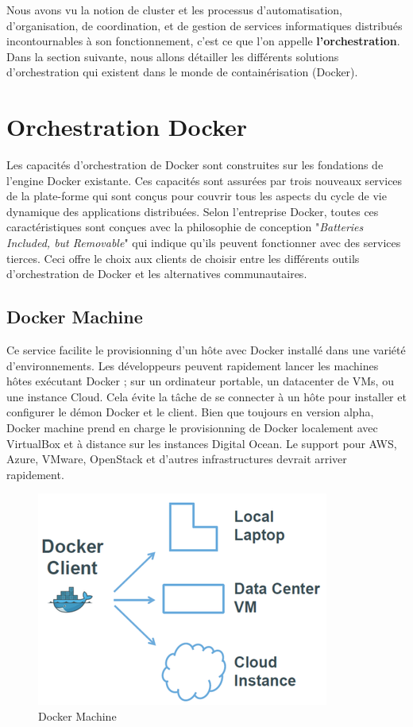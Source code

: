 \begin{onehalfspace}
Nous avons vu la notion de cluster et les processus d'automatisation, d'organisation, de coordination, et de gestion de services informatiques distribués incontournables à son fonctionnement, c'est ce que l'on appelle \textbf{l'orchestration}. Dans la section suivante, nous allons détailler les différents solutions d'orchestration qui existent dans le monde de containérisation (Docker).

\section{Orchestration Docker}
Les capacités d'orchestration de Docker sont construites sur les fondations de l'engine Docker existante. Ces capacités sont assurées par trois nouveaux services de la plate-forme qui sont conçus pour couvrir tous les aspects du cycle de vie dynamique des applications distribuées. Selon l'entreprise Docker, toutes ces caractéristiques sont conçues avec la philosophie de conception "\emph{Batteries Included, but Removable}" qui indique qu'ils peuvent fonctionner avec des services tierces. Ceci offre le choix aux clients de choisir entre les différents outils d'orchestration de Docker et les alternatives communautaires.


\subsection{Docker Machine}
 Ce service facilite le provisionning d'un hôte avec Docker installé dans une variété d'environnements. Les développeurs peuvent rapidement lancer les machines hôtes exécutant Docker ; sur un ordinateur portable, un datacenter de VMs, ou une instance Cloud. Cela évite la tâche de se connecter à un hôte pour installer et configurer le démon Docker et le client. Bien que toujours en version alpha, Docker machine prend en charge le provisionning de Docker localement avec VirtualBox et à distance sur les instances Digital Ocean. Le support pour AWS, Azure, VMware, OpenStack et d'autres infrastructures devrait arriver rapidement.
 \begin{figure}[H]
\centering
\includegraphics [scale=0.6]{chapitre3/assets/dockermachine.png}
\caption{Docker Machine}
\end{figure}

\end{onehalfspace}
